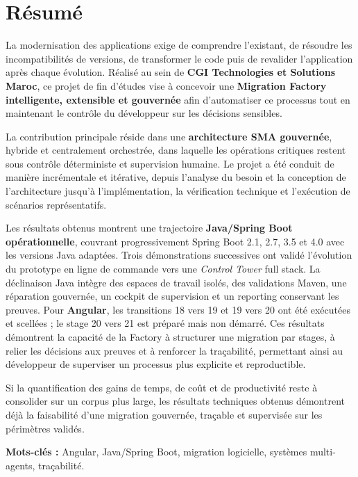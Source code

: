 \chapter*{Résumé}

La modernisation des applications exige de comprendre l'existant, de résoudre les incompatibilités de versions, de transformer le code puis de revalider l'application après chaque évolution. Réalisé au sein de \textbf{CGI Technologies et Solutions Maroc}, ce projet de fin d'études vise à concevoir une \textbf{Migration Factory intelligente, extensible et gouvernée} afin d'automatiser ce processus tout en maintenant le contrôle du développeur sur les décisions sensibles.

La contribution principale réside dans une \textbf{architecture SMA gouvernée}, hybride et centralement orchestrée, dans laquelle les opérations critiques restent sous contrôle déterministe et supervision humaine. Le projet a été conduit de manière incrémentale et itérative, depuis l'analyse du besoin et la conception de l'architecture jusqu'à l'implémentation, la vérification technique et l'exécution de scénarios représentatifs.

Les résultats obtenus montrent une trajectoire \textbf{Java/Spring Boot opérationnelle}, couvrant progressivement Spring Boot 2.1, 2.7, 3.5 et 4.0 avec les versions Java adaptées. Trois démonstrations successives ont validé l'évolution du prototype en ligne de commande vers une \textit{Control Tower} full stack. La déclinaison Java intègre des espaces de travail isolés, des validations Maven, une réparation gouvernée, un cockpit de supervision et un reporting conservant les preuves. Pour \textbf{Angular}, les transitions 18 vers 19 et 19 vers 20 ont été exécutées et scellées ; le stage 20 vers 21 est préparé mais non démarré. Ces résultats démontrent la capacité de la Factory à structurer une migration par stages, à relier les décisions aux preuves et à renforcer la traçabilité, permettant ainsi au développeur de superviser un processus plus explicite et reproductible.

Si la quantification des gains de temps, de coût et de productivité reste à consolider sur un corpus plus large, les résultats techniques obtenus démontrent déjà la faisabilité d'une migration gouvernée, traçable et supervisée sur les périmètres validés.

\vspace{0.4cm}
\noindent\textbf{Mots-clés :} Angular, Java/Spring Boot, migration logicielle, systèmes multi-agents, traçabilité.
